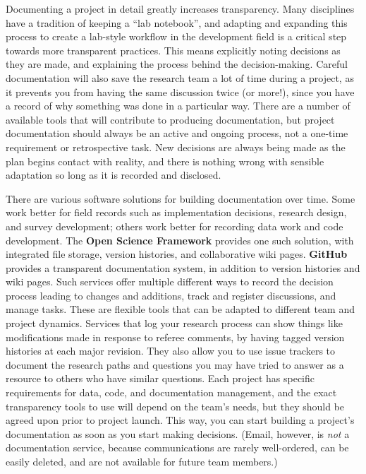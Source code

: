 Documenting a project in detail greatly increases transparency.
Many disciplines have a tradition of keeping a ``lab notebook'',
and adapting and expanding this process to create a
lab-style workflow in the development field is a
critical step towards more transparent practices.
This means explicitly noting decisions as they are made,
and explaining the process behind the decision-making.
Careful documentation will also save the research team a lot of time during a project,
as it prevents you from having the same discussion twice (or more!),
since you have a record of why something was done in a particular way.
There are a number of available tools
that will contribute to producing documentation,
but project documentation should always be an active and ongoing process,
not a one-time requirement or retrospective task.
New decisions are always being made as the plan begins contact with reality,
and there is nothing wrong with sensible adaptation so long as it is recorded and disclosed.

There are various software solutions for building documentation over time.
Some work better for field records such as implementation decisions,
research design, and survey development;
others work better for recording data work and code development.
The \textbf{Open Science Framework} provides one such solution,
with integrated file storage, version histories, and collaborative wiki pages.
\textbf{GitHub} provides a transparent documentation system,
in addition to version histories and wiki pages.
Such services offer multiple different ways
to record the decision process leading to changes and additions,
track and register discussions, and manage tasks.
These are flexible tools that can be adapted to different team and project dynamics.
Services that log your research process can show things like modifications made in response to referee comments,
by having tagged version histories at each major revision.
They also allow you to use issue trackers
to document the research paths and questions you may have tried to answer
as a resource to others who have similar questions.
Each project has specific requirements for data, code, and documentation management,
and the exact transparency tools to use will depend on the team's needs,
but they should be agreed upon prior to project launch.
This way, you can start building a project's documentation as soon as you start making decisions.
(Email, however, is \textit{not} a documentation service, because communications are rarely well-ordered,
can be easily deleted, and are not available for future team members.)

